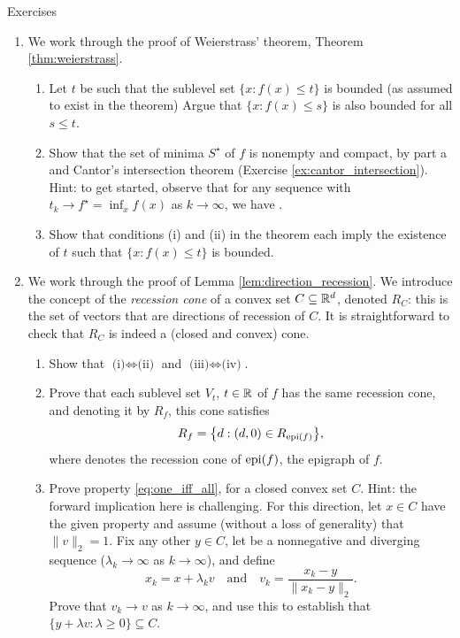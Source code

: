 \begin{xcb}{Exercises}
\begin{enumerate}[label=\thechapter.\arabic*]
\item \label{ex:weierstrass} 
  We work through the proof of Weierstrass' theorem, Theorem
  \ref{thm:weierstrass}. 

\begin{enumerate}[label=\alph*.]
\item Let $t$ be such that the sublevel set $\{x : f(x) \leq t\}$ is bounded (as
  assumed to exist in the theorem) Argue that $\{x : f(x) \leq s\}$ is also
  bounded for all $s \leq t$. 

\item Show that the set of minima $S^\star$ of $f$ is nonempty and compact,
  by part a and Cantor's intersection theorem (Exercise
  \ref{ex:cantor_intersection}). Hint: to get started, observe that for any 
  sequence  with $t_k \to f^\star = \inf_x f(x)$
  as $k \to \infty$, we have .   

\item Show that conditions (i) and (ii) in the theorem each imply the existence
  of $t$ such that $\{x : f(x) \leq t\}$ is bounded. 
\end{enumerate}

\item \label{ex:direction_recession}
  We work through the proof of Lemma \ref{lem:direction_recession}. We introduce
  the concept of the \emph{recession cone} of a convex set $C \subseteq \mathbb{R}^d$, 
  denoted $R_C$: this is the set of vectors that are directions of recession of
  $C$. It is straightforward to check that $R_C$ is indeed a (closed and convex) 
  cone. 

\begin{enumerate}[label=\alph*.]
\item Show that $\text{(i)} \iff \text{(ii)}$ and $\text{(iii)} \iff
  \text{(iv)}$. 

\item Prove that each sublevel set $V_t$, $t \in \mathbb{R}$ of $f$ has the same
  recession cone, and denoting it by $R_f$, this cone satisfies 
  \[
  R_f = \big\{d : (d,0) \in R_{\operatorname{epi}(f)}\big\},
  \]
  where  denotes the recession cone of $\operatorname{epi}(f)$, the
  epigraph of $f$. 

\item Prove property \eqref{eq:one_iff_all}, for a closed convex set $C$. Hint:
  the forward implication here is challenging. For this direction, let $x \in C$
  have the given property and assume (without a loss of generality) that
  $\|v\|_2 =  1$. Fix any other $y \in C$, let
   be a nonnegative and diverging sequence
  ($\lambda_k \to \infty$ as $k \to \infty$), and define 
  \[
  x_k = x + \lambda_k v \quad \text{and} \quad v_k = \frac{x_k - y}{\|x_k -
    y\|_2}. 
  \] 
  Prove that $v_k \to v$ as $k \to \infty$, and use this to establish that $\{y
  + \lambda v : \lambda \geq 0\} \subseteq C$. 


\end{enumerate}
\end{enumerate}
\end{xcb}
